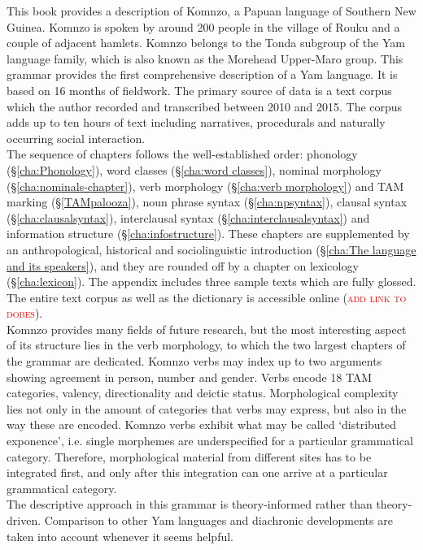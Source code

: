 \begin{refsection}

This book provides a description of Komnzo, a Papuan language of Southern New Guinea. Komnzo is spoken by around 200 people in the village of Rouku and a couple of adjacent hamlets. Komnzo belongs to the Tonda subgroup of the Yam language family, which is also known as the Morehead Upper-Maro group. This grammar provides the first comprehensive description of a Yam language. It is based on 16 months of fieldwork. The primary source of data is a text corpus which the author recorded and transcribed between 2010 and 2015. The corpus adds up to ten hours of text including narratives, procedurals and naturally occurring social interaction.\\

The sequence of chapters follows the well-established order: phonology (\S\ref{cha:Phonology}), word classes (\S\ref{cha:word classes}), nominal morphology (\S\ref{cha:nominals-chapter}), verb morphology (\S\ref{cha:verb morphology}) and TAM marking (\S\ref{TAMpalooza}), noun phrase syntax (\S\ref{cha:npsyntax}), clausal syntax (\S\ref{cha:clausalsyntax}), interclausal syntax (\S\ref{cha:interclausalsyntax}) and information structure (\S\ref{cha:infostructure}). These chapters are supplemented by an anthropological, historical and sociolinguistic introduction (\S\ref{cha:The language and its speakers}), and they are rounded off by a chapter on lexicology (\S\ref{cha:lexicon}). The appendix includes three sample texts which are fully glossed. The entire text corpus as well as the dictionary is accessible online (\textcolor{red}{\textsc{add link to dobes}}).\\

Komnzo provides many fields of future research, but the most interesting aspect of its structure lies in the verb morphology, to which the two largest chapters of the grammar are dedicated. Komnzo verbs may index up to two arguments showing agreement in person, number and gender. Verbs encode 18 TAM categories, valency, directionality and deictic status. Morphological complexity lies not only in the amount of categories that verbs may express, but also in the way these are encoded. Komnzo verbs exhibit what may be called `distributed exponence', i.e. single morphemes are underspecified for a particular grammatical category. Therefore, morphological material from different sites has to be integrated first, and only after this integration can one arrive at a particular grammatical category.\\

The descriptive approach in this grammar is theory-informed rather than theory-driven. Comparison to other Yam languages and diachronic developments are taken into account whenever it seems helpful.

\printbibliography[heading=subbibliography]
\end{refsection}


